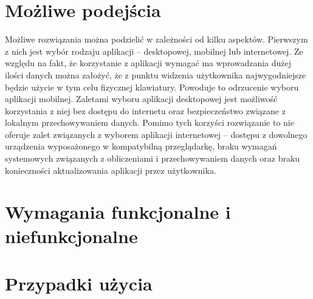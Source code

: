 \section{Możliwe podejścia}
Możliwe rozwiązania można podzielić w zależności od kilku aspektów. Pierwszym z nich jest wybór rodzaju aplikacji -- desktopowej, mobilnej lub internetowej. Ze względu na fakt, że korzystanie z aplikacji wymagać ma wprowadzania dużej ilości danych można założyć, że z punktu widzenia użytkownika najwygodniejsze będzie użycie w tym celu fizycznej klawiatury. Powoduje to odrzucenie wyboru aplikacji mobilnej. Zaletami  wyboru aplikacji desktopowej jest możliwość korzystania z niej bez dostępu do internetu oraz bezpieczeństwo związane z lokalnym przechowywaniem danych. Pomimo tych korzyści rozwiązanie to nie oferuje zalet związanych z wyborem aplikacji internetowej -- dostępu z dowolnego urządzenia wyposażonego w kompatybilną przeglądarkę, braku wymagań systemowych związanych z obliczeniami i przechowywaniem danych oraz braku konieczności aktualizowania aplikacji przez użytkownika.
\section{Wymagania funkcjonalne i niefunkcjonalne}
\section{Przypadki użycia}